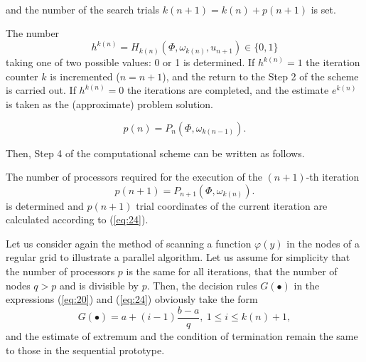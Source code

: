 \begin{description}
{\begin{equation}
\begin{gathered}
\end{gathered}
\end{equation}
and the number of the search trials $k(n+1)=k(n)+p(n+1)$  is set.}
\item[\textbf{Step 5}]{The number 
\begin{equation}
\label{eq:25}
h^{k(n)}=H_{k(n)}(\Phi,\omega_{k(n)},u_{n+1})\in \{0,1\}
\end{equation}
taking one of two possible values: 0 or 1 is determined. If $h^{k(n)}=1$ the iteration counter $k$ is incremented ($n=n+1$), and the return to the Step 2 of the scheme is carried out. If $h^{k(n)}=0$ the  iterations are completed, and the estimate $e^{k(n)}$  is taken as the (approximate) problem solution.}
\end{description}
\begin{displaymath}
p(n)= P_n(\Phi,\omega_{k(n-1)}).
\end{displaymath}

Then, Step 4 of the computational scheme can be written as follows. 
\begin{description}
\item[\textbf{Step 4}]{The number of processors required for the execution of the  $(n+1)$-th iteration 
\begin{displaymath}
p(n+1)= P_{n+1}(\Phi,\omega_{k(n)}).
\end{displaymath}
is determined and $p(n+1)$  trial coordinates of the current iteration are calculated according to (\ref{eq:24}).}
\end{description}

Let us consider again the method of scanning  a function $\varphi(y)$ in the nodes of a regular grid to illustrate a parallel algorithm. Let us assume for simplicity that the number of processors $p$ is the same for all iterations, that the number of nodes $q>p$  and is divisible by $p$. Then, the decision rules $G(\bullet )$  in the expressions (\ref{eq:20}) and (\ref{eq:24})  obviously take the form 
\begin{displaymath}
G(\bullet )=a+(i-1)\frac{b-a}{q},\ 1\leq i\leq k(n)+1,
\end{displaymath}
and the estimate of extremum and the condition of termination remain the same to those in the sequential prototype. 

